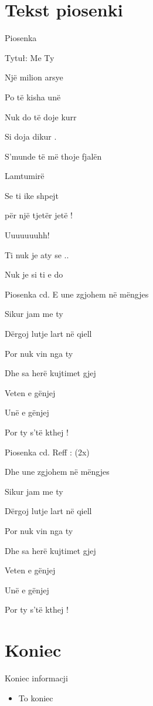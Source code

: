 \documentclass{beamer}
\begin{document}
\section{Tekst piosenki}
\begin{frame}{Piosenka}

Tytuł: Me Ty
\newline

Një milion arsye 

Po të kisha unë 

Nuk do të doje kurr 

Si doja dikur . 

S'munde të më thoje fjalën 

Lamtumirë 

Se ti ike shpejt 

për një tjetër jetë ! 

Uuuuuuuhh! 

Ti nuk je aty se .. 

Nuk je si ti e do 

\end {frame}

\begin{frame}{Piosenka cd.}
E une zgjohem në mëngjes 

Sikur jam me ty 

Dërgoj lutje lart në qiell 

Por nuk vin nga ty 

Dhe sa herë kujtimet gjej 

Veten e gënjej 

Unë e gënjej 

Por ty s'të kthej ! 

\end {frame}
\begin{frame}{Piosenka cd.}
Reff : (2x) 

Dhe une zgjohem në mëngjes 

Sikur jam me ty 

Dërgoj lutje lart në qiell 

Por nuk vin nga ty 

Dhe sa herë kujtimet gjej 

Veten e gënjej 

Unë e gënjej 

Por ty s'të kthej ! 

\end {frame}

\section{Koniec}
\begin{frame}{Koniec informacji}
\begin {itemize}
\item To koniec
\end {itemize}
\end {frame}
\end{document}

